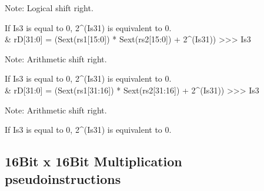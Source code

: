\documentclass[letterpaper,10pt,english]{sphinxmanual}
\begin{document}
\begin{savenotes}
\begin{tabular}[t]{}
\sphinxAtStartPar
Note: Logical shift right.

\sphinxAtStartPar
If Is3 is equal to 0, 2\textasciicircum{}(Is3\sphinxhyphen{}1) is equivalent to 0.
\\
\sphinxhline
\sphinxAtStartPar
{}
&
\sphinxAtStartPar
rD{[}31:0{]} = (Sext(rs1{[}15:0{]}) * Sext(rs2{[}15:0{]}) + 2\textasciicircum{}(Is3\sphinxhyphen{}1)) \textgreater{}\textgreater{}\textgreater{} Is3

\sphinxAtStartPar
Note: Arithmetic shift right.

\sphinxAtStartPar
If Is3 is equal to 0, 2\textasciicircum{}(Is3\sphinxhyphen{}1) is equivalent to 0.
\\
\sphinxhline
\sphinxAtStartPar
{}
&
\sphinxAtStartPar
rD{[}31:0{]} = (Sext(rs1{[}31:16{]}) * Sext(rs2{[}31:16{]}) + 2\textasciicircum{}(Is3\sphinxhyphen{}1)) \textgreater{}\textgreater{}\textgreater{} Is3

\sphinxAtStartPar
Note: Arithmetic shift right.

\sphinxAtStartPar
If Is3 is equal to 0, 2\textasciicircum{}(Is3\sphinxhyphen{}1) is equivalent to 0.
\\
\sphinxbottomrule
\end{tabular}
\sphinxtableafterendhook\par
\sphinxattableend\end{savenotes}


\subsection{16\sphinxhyphen{}Bit x 16\sphinxhyphen{}Bit Multiplication pseudo\sphinxhyphen{}instructions}
\label{\detokenize{instruction_set_extensions:bit-x-16-bit-multiplication-pseudo-instructions}}\label{\detokenize{instruction_set_extensions:corev-16-bit-multiply-pseudo-instructions}}
\end{document}
